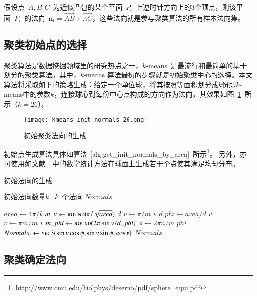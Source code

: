 假设点~$A,B,C$~为近似凸包的某个平面~$P_i$~上逆时针方向上的3个顶点，则该平面~$P_i$~的法向~$\bm{n_i}
= \overrightarrow{AB} \times
\overrightarrow{AC}$，这些法向就是参与聚类算法的所有样本法向集。

\subsection{聚类初始点的选择}
\label{subsec:initial-normals}

聚类算法是数据挖掘领域里的研究热点之一，$k$-means~是最流行和最简单的基于划分的聚类算法\cite{Jain2010}。其中，$k$-means
算法最初的步骤就是初始聚类中心的选择。本文算法将采取如下的策略生成：给定一个单位球，将其按照等面积划分成$k$份即$k$-means中的参数$k$，连接球心到每份中心点构成的方向作为法向，其效果如图~\ref{lbl:kmeans-init-normals-26}~所示（$k=26$）。

\begin{figure}[htbp]
    \centering
    \texttt{[image: kmeans-init-normals-26.png]}
    \caption{初始聚类法向的生成}
    \label{lbl:kmeans-init-normals-26}
\end{figure}
初始点生成算法具体如算法~\ref{alg:get_init_normals_by_area}~所示\footnote{http://www.cmu.edu/biolphys/deserno/pdf/sphere\_equi.pdf}。
另外，亦可使用如文献~~中的数学统计方法在球面上生成若干个点使其满足均匀分布。

\begin{algorithm}[htbp]
\small
\caption{初始法向的生成}
\label{alg:get_init_normals_by_area}
\begin{algorithmic}[1]
\Require
初始法向数量$k$
\Ensure
~$k$~个法向 $Normals$

  \State $area \leftarrow 4\pi / k$
  \State $m\_v \gets \Call{round}{\pi/\sqrt{area}}$
  \State $d\_v \gets \pi/m\_v$
  \State $d\_phi \gets area/d\_v$
      \State $v \gets \pi m/m\_v$
      \State $m\_phi \gets \Call{round}{2\pi\sin{v}/d\_phi}$
          \State $\phi \gets 2\pi n/m\_phi$
          \State $Normals_i \gets \Call{vec3}{\sin{v}\cos{\phi},\sin{v}\sin{\phi},\cos{v}}$
      \EndFor
  \EndFor
  \State \Return $Normals$
  \EndFunction
\end{algorithmic}
\end{algorithm}
 
\subsection{聚类确定法向}
\label{subsec:determ-normals}

